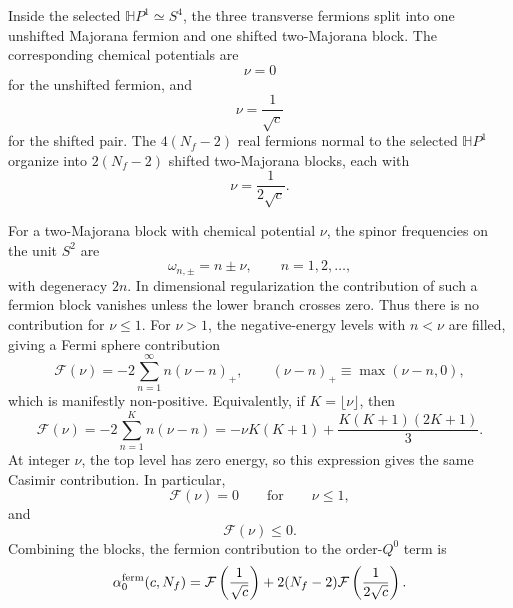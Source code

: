 \documentclass[a4paper,11pt]{article}
\begin{document}
Inside the selected $\mathbb HP^1\simeq S^4$, the three transverse fermions split into one unshifted Majorana fermion and one shifted two-Majorana block. The corresponding chemical potentials are
\begin{equation}
  \nu=0
\end{equation}
for the unshifted fermion, and
\begin{equation}
  \nu=\frac1{\sqrt c}
\end{equation}
for the shifted pair. The $4(N_f-2)$ real fermions normal to the selected $\mathbb HP^1$ organize into $2(N_f-2)$ shifted two-Majorana blocks, each with
\begin{equation}
  \nu=\frac1{2\sqrt c}.
\end{equation}

For a two-Majorana block with chemical potential $\nu$, the spinor
frequencies on the unit $S^2$ are
\begin{equation}\label{eq:two-majorana-spectrum}
  \omega_{n,\pm} = n\pm\nu, \qquad n=1,2,\ldots,
\end{equation}
with degeneracy $2n$. In dimensional regularization the contribution of such a fermion block vanishes unless the lower branch crosses zero. Thus there is no contribution for $\nu\leq1$. For $\nu>1$, the negative-energy levels with $n<\nu$ are filled, giving a Fermi sphere contribution
\begin{equation}\label{eq:fermion-casimir-function}
  \mathcal F(\nu) = -2\sum_{n=1}^{\infty}n(\nu-n)_+, \qquad (\nu-n)_+ \equiv \max(\nu-n,0),
\end{equation}
which is manifestly non-positive. Equivalently, if $K=\lfloor\nu\rfloor$, then
\begin{equation}
  \mathcal F(\nu)
  =
  -2\sum_{n=1}^{K}n(\nu-n)
  =
  -\nu K(K+1)
  +
  \frac{K(K+1)(2K+1)}{3}.
\end{equation}
At integer $\nu$, the top level has zero energy, so this expression gives the same Casimir contribution. In particular,
\begin{equation}
  \mathcal F(\nu)=0 \qquad \text{for} \qquad \nu\leq1,
\end{equation}
and
\begin{equation}
  \mathcal F(\nu)\leq0.
\end{equation}
Combining the blocks, the fermion contribution to the order-$Q^0$ term is
\begin{equation}
  \alpha_0^{\rm ferm}(c,N_f) = \mathcal F\left(\frac1{\sqrt c}\right) + 2(N_f-2) \mathcal F\left(\frac1{2\sqrt c}\right).
\end{equation}
\end{document}
